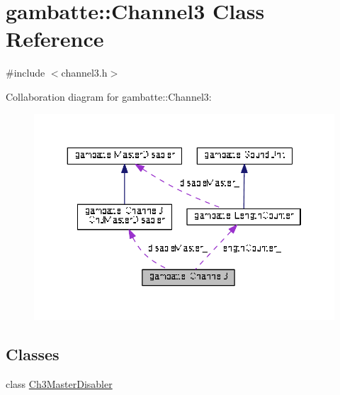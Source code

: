 \hypertarget{classgambatte_1_1Channel3}{}\section{gambatte\+:\+:Channel3 Class Reference}
\label{classgambatte_1_1Channel3}


{\ttfamily \#include $<$channel3.\+h$>$}



Collaboration diagram for gambatte\+:\+:Channel3\+:
\nopagebreak
\begin{figure}[H]
\begin{center}
\leavevmode
\includegraphics[width=350pt]{classgambatte_1_1Channel3__coll__graph}
\end{center}
\end{figure}
\subsection*{Classes}
\begin{DoxyCompactItemize}
\item 
class \hyperlink{classgambatte_1_1Channel3_1_1Ch3MasterDisabler}{Ch3\+Master\+Disabler}
\end{DoxyCompactItemize}
